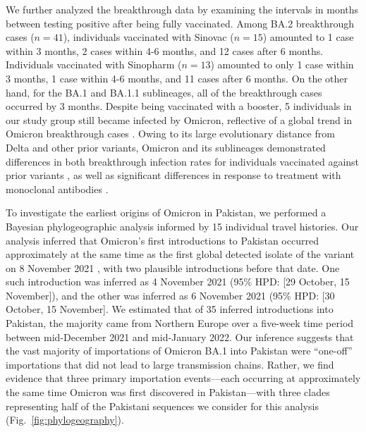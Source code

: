 
We further analyzed the breakthrough data by examining the intervals in months between testing positive after being fully vaccinated.
Among BA.2 breakthrough cases ($n=41$), individuals vaccinated with Sinovac ($n=15$) amounted to 1 case within 3 months, 2 cases within 4-6 months, and 12 cases after 6 months.
Individuals vaccinated with Sinopharm ($n=13$) amounted to only 1 case within 3 months, 1 case within 4-6 months, and 11 cases after 6 months.
On the other hand, for the BA.1 and BA.1.1 sublineages, all of the breakthrough cases occurred by 3 months.
Despite being vaccinated with a booster, 5 individuals in our study group still became infected by Omicron, reflective of a global trend in Omicron breakthrough cases \citep{goga2022breakthrough}.
Owing to its large evolutionary distance from Delta and other prior variants, Omicron and its sublineages demonstrated differences in both breakthrough infection rates for individuals vaccinated against prior variants \citep{safdar2023waning}, as well as significant differences in response to treatment with monoclonal antibodies \citep{bruel2022serum}.

To investigate the earliest origins of Omicron in Pakistan, we performed a Bayesian phylogeographic analysis informed by 15 individual travel histories.
Our analysis inferred that Omicron's first introductions to Pakistan occurred approximately at the same time as the first global detected isolate of the variant on 8 November 2021 \citep{dyer2021covid}, with two plausible introductions before that date.
One such introduction was inferred as 4 November 2021 (95\% HPD: [29 October, 15 November]), and the other was inferred as 6 November 2021 (95\% HPD: [30 October, 15 November].
We estimated that of 35 inferred introductions into Pakistan, the majority came from Northern Europe over a five-week time period between mid-December 2021 and mid-January 2022.
Our inference suggests that the vast majority of importations of Omicron BA.1 into Pakistan were ``one-off'' importations that did not lead to large transmission chains.
Rather, we find evidence that three primary importation events---each occurring at approximately the same time Omicron was first discovered in Pakistan---with three clades representing half of the Pakistani sequences we consider for this analysis (Fig.~\ref{fig:phylogeography}).

